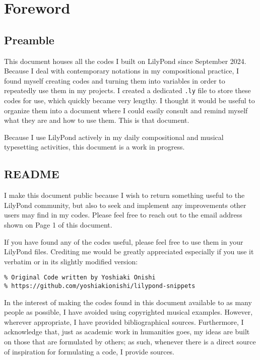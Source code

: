 
\chapter{Foreword}
\section{Preamble}
This document houses all the codes I built on LilyPond since September 2024. Because I deal with contemporary notations in my compositional practice, I found myself creating codes and turning them into variables in order to repeatedly use them in my projects. I created a dedicated \verb|.ly| file to store these codes for use, which quickly became very lengthy. I thought it would be useful to organize them into a document where I could easily consult and remind myself what they are and how to use them. This is that document.

Because I use LilyPond actively in my daily compositional and musical typesetting activities, this document is a work in progress. 

\section{README}

I make this document public because I wish to return something useful to the LilyPond community, but also to seek and implement any improvements other users may find in my codes. Please feel free to reach out to the email address shown on Page 1 of this document.

If you have found any of the codes useful, please feel free to use them in your LilyPond files. Crediting me would be greatly appreciated especially if you use it verbatim or in its slightly modified version:

\begin{verbatim}
% Original Code written by Yoshiaki Onishi
% https://github.com/yoshiakionishi/lilypond-snippets
\end{verbatim}

In the interest of making the codes found in this document available to as many people as possible, I have avoided using copyrighted musical examples. However, wherever appropriate, I have provided bibliographical sources. Furthermore, I acknowledge that, just as academic work in humanities goes, my ideas are built on those that are formulated by others; as such, whenever there is a direct source of inspiration for formulating a code, I provide sources. 

